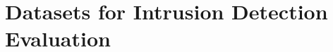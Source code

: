 \chapter{Datasets for Intrusion Detection Evaluation}
\label{app:datasets}

\textcolor{dimgray}{\lipsum[1-6]}